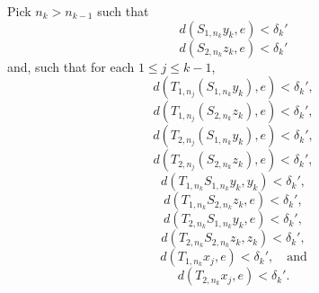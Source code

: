 \documentclass[12pt,a4paper]{amsart}
\theoremstyle{plain}
\theoremstyle{definition}
\theoremstyle{remark}
\theoremstyle{fact}
\begin{document}
    Pick $n_k>n_{k-1}$ such that
     \begin{equation}\label{eq26}
        d(S_{1, n_k}y_k,e)<\delta_k'
    \end{equation}
    \begin{equation}\label{eq27}
        d(S_{2, n_k}z_k,e)<\delta_k'
    \end{equation}
    and, such that for each $1\leq j\leq k-1$, 
    \begin{equation}\label{eq28}
       d(T_{1, n_j}(S_{1, n_k}y_k),e)<\delta_k',
    \end{equation}
    \begin{equation}\label{eq29}
       d(T_{1, n_j}(S_{2, n_k}z_k),e)<\delta_k', 
    \end{equation}
     \begin{equation}\label{eq30}
       d(T_{2, n_j}(S_{1, n_k}y_k),e)<\delta_k', 
    \end{equation}
    \begin{equation}\label{eq31}
       d(T_{2, n_j}(S_{2, n_k}z_k),e)<\delta_k', 
    \end{equation}
    \begin{equation}\label{eq32}
       d(T_{1, n_k}S_{1, n_k}y_k,y_k)<\delta_k',  
    \end{equation}
    \begin{equation}\label{eq33}
        d(T_{1, n_k}S_{2, n_k}z_k,e)<\delta_k',
    \end{equation}
    \begin{equation}\label{eq34}
         d(T_{2, n_k}S_{1, n_k}y_k,e)<\delta_k',
    \end{equation}
    \begin{equation}\label{eq35}
         d(T_{2, n_k}S_{2, n_k}z_k,z_k)<\delta_k',
    \end{equation}
    \begin{equation}\label{eq36}
     d(T_{1, n_k}x_j,e)<\delta_k',  \quad \text{and}   
    \end{equation}
     \begin{equation}\label{eq37}
     d(T_{2, n_k}x_j,e)<\delta_k'.
    \end{equation}
    
    
    
    
    
\end{document}
